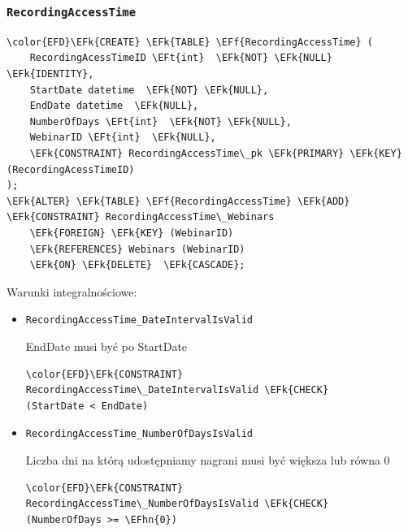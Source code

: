 \documentclass[11pt]{article}
\newcommand{\EFk}[1]{\textcolor{EFk}{\textbf{#1}}} %
\newcommand{\EFf}[1]{\textcolor{EFf}{#1}} %
\newcommand{\EFt}[1]{\textcolor{EFt}{\textbf{#1}}} %
\newcommand{\EFhn}[1]{\textcolor{EFhn}{#1}} %
\begin{document}
\subsubsection{\texttt{RecordingAccessTime}}
\label{sec:org6270382}
\begin{Code}
\begin{Verbatim}
\color{EFD}\EFk{CREATE} \EFk{TABLE} \EFf{RecordingAccessTime} (
    RecordingAcessTimeID \EFt{int}  \EFk{NOT} \EFk{NULL} \EFk{IDENTITY},
    StartDate datetime  \EFk{NOT} \EFk{NULL},
    EndDate datetime  \EFk{NULL},
    NumberOfDays \EFt{int}  \EFk{NOT} \EFk{NULL},
    WebinarID \EFt{int}  \EFk{NULL},
    \EFk{CONSTRAINT} RecordingAccessTime\_pk \EFk{PRIMARY} \EFk{KEY}  (RecordingAcessTimeID)
);
\EFk{ALTER} \EFk{TABLE} \EFf{RecordingAccessTime} \EFk{ADD} \EFk{CONSTRAINT} RecordingAccessTime\_Webinars
    \EFk{FOREIGN} \EFk{KEY} (WebinarID)
    \EFk{REFERENCES} Webinars (WebinarID)
    \EFk{ON} \EFk{DELETE}  \EFk{CASCADE};
\end{Verbatim}
\end{Code}
Warunki integralnościowe:


\begin{itemize}
\item \texttt{RecordingAccessTime\_DateIntervalIsValid}

EndDate musi być po StartDate
\begin{Code}
\begin{Verbatim}
\color{EFD}\EFk{CONSTRAINT} RecordingAccessTime\_DateIntervalIsValid \EFk{CHECK}
(StartDate < EndDate)
\end{Verbatim}
\end{Code}
\item \texttt{RecordingAccessTime\_NumberOfDaysIsValid}

Liczba dni na którą udostępniamy nagrani musi być większa lub równa 0
\begin{Code}
\begin{Verbatim}
\color{EFD}\EFk{CONSTRAINT} RecordingAccessTime\_NumberOfDaysIsValid \EFk{CHECK}
(NumberOfDays >= \EFhn{0})
\end{Verbatim}
\end{Code}
\end{itemize}
\end{document}
